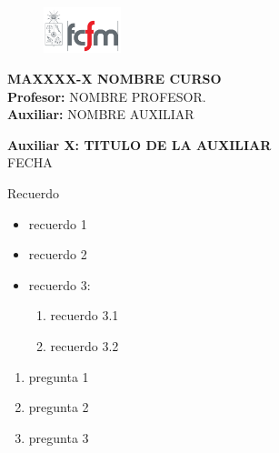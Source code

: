 \documentclass[letterpaper,11pt]{article}
\theoremstyle{plain}
\begin{document}
\newpage
\pagestyle{fancy}
\fancyhf{}

\begin{figure} %
    \vspace{-5mm}
    \includegraphics[width=0.2\textwidth]{img/fcfm2.png}
\end{figure}

\noindent
\textbf{MAXXXX-X NOMBRE CURSO}\\
\textbf{Profesor: }NOMBRE PROFESOR.\\
\textbf{Auxiliar: }NOMBRE AUXILIAR

\begin{center}
{\bf \Large Auxiliar X: TITULO DE LA AUXILIAR}\\
{FECHA} %
\end{center}

\begin{framed}Recuerdo
		\begin{multicols}{2}
		    \begin{itemize}  
		        \item recuerdo 1
		        \item recuerdo 2
		        \item recuerdo 3:
		            \begin{enumerate}
		                \item recuerdo 3.1
		                \item recuerdo 3.2
		            \end{enumerate}
            \end{itemize}
        \end{multicols}
\end{framed}


\begin{enumerate}[\bf P1.]
    \item pregunta 1
    
    \item pregunta 2
    
    \item pregunta 3
\end{enumerate}
\end{document}
